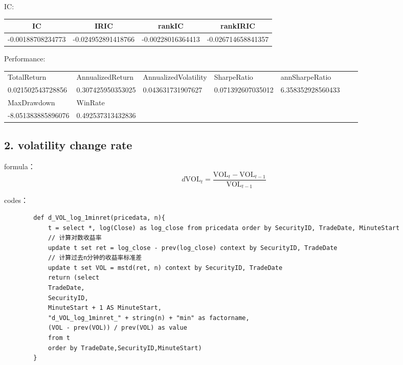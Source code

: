 \documentclass[10pt,a4paper]{article}
\begin{document}
	IC:
	\begin{table}[h!]
		\begin{tabular}{@{}|c|c|c|c|@{}}
			\toprule
			IC                & IRIC               & rankIC            & rankIRIC           \\ \midrule
			-0.00188708234773 & -0.024952891418766 & -0.00228016364413 & -0.026714658841357 \\ \bottomrule
		\end{tabular}
	\end{table}
	
	Performance:
	\begin{table}[h!]
		\begin{tabular}{@{}|l|l|lllll@{}}
			\cmidrule(r){1-5}
			TotalReturn                              & AnnualizedReturn  & \multicolumn{1}{l|}{AnnualizedVolatility} & \multicolumn{1}{l|}{SharpeRatio}       & \multicolumn{1}{l|}{annSharpeRatio}    &                      &  \\ \cmidrule(r){1-5}
			0.021502543728856                        & 0.307425950353025 & \multicolumn{1}{l|}{0.043631731907627}    & \multicolumn{1}{l|}{0.071392607035012} & \multicolumn{1}{l|}{6.358352928560433} & \multicolumn{1}{c}{} &  \\ \cmidrule(r){1-5}
			MaxDrawdown                              & WinRate           &                                           &                                        &                                        &                      &  \\ \cmidrule(r){1-2}
			\multicolumn{1}{|c|}{-8.051383885896076} & 0.492537313432836 &                                           &                                        &                                        &                      &  \\ \cmidrule(r){1-2}
		\end{tabular}
	\end{table}
	
	
	\subsection*{2. volatility change rate}
	formula：
	\[d \text{VOL}_t = \frac{\text{VOL}_t - \text{VOL}_{t-1}}{\text{VOL}_{t-1}}\]
	
	codes：
	\begin{lstlisting}
		def d_VOL_log_1minret(pricedata, n){
			t = select *, log(Close) as log_close from pricedata order by SecurityID, TradeDate, MinuteStart
			// 计算对数收益率
			update t set ret = log_close - prev(log_close) context by SecurityID, TradeDate
			// 计算过去n分钟的收益率标准差
			update t set VOL = mstd(ret, n) context by SecurityID, TradeDate
			return (select
			TradeDate,
			SecurityID,
			MinuteStart + 1 AS MinuteStart,
			"d_VOL_log_1minret_" + string(n) + "min" as factorname,
			(VOL - prev(VOL)) / prev(VOL) as value
			from t
			order by TradeDate,SecurityID,MinuteStart)
		}
	\end{lstlisting}
	
\end{document}
